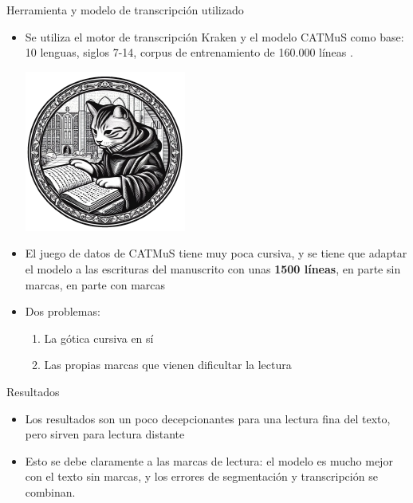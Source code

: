 \documentclass[11pt,aspectratio=169]{beamer}
\begin{document}
\begin{frame}{Herramienta y modelo de transcripción utilizado}
\begin{itemize}
\item Se utiliza el motor de transcripción Kraken \parencite{kiessling_KrakenUniversalText_2019} y el modelo CATMuS como base: 10 lenguas, siglos 7-14, corpus de entrenamiento de 160.000 líneas \parencite{clerice_CATMuSMedievalMultilingual_2024}.\\
\begin{center}
\includegraphics[scale=.3]{img/catmus.png}
\end{center}
\item El juego de datos de CATMuS tiene muy poca cursiva, y se tiene que adaptar el modelo a las escrituras del manuscrito con unas \textbf{1500 líneas}, en parte sin marcas, en parte con marcas
\item Dos problemas:
\begin{enumerate}
\item La gótica cursiva en sí
\item Las propias marcas que vienen dificultar la lectura
\end{enumerate} 
\end{itemize}
\end{frame}


\begin{frame}{Resultados}
\begin{itemize}
\item Los resultados son un poco decepcionantes para una lectura fina del texto, pero sirven para lectura distante
\item Esto se debe claramente a las marcas de lectura: el modelo es mucho mejor con el texto sin marcas, y los errores de segmentación y transcripción se combinan.
\end{itemize}
\end{frame}
\end{document}
